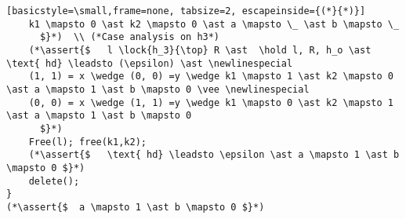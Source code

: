 \documentclass[8pt]{article}
\newcommand{\lock}[2]{ \square \hspace{-1ex} \xrightarrow[#1]{#2}}
\newcommand{\hold}{\text{Hold }}
\newcommand{\assert}[1]{\textcolor{blue}{ \{ #1 \}  } }
\newcommand{\newlinespecial}{\newline \hphantom{100pt}}
\begin{document}
\begin{lstlisting}[basicstyle=\small,frame=none, tabsize=2, escapeinside={(*}{*)}]
	k1 \mapsto 0 \ast k2 \mapsto 0 \ast a \mapsto \_ \ast b \mapsto \_
	  $}*)  \\ (*Case analysis on h3*)
	(*\assert{$   l \lock{h_3}{\top} R \ast  \hold l, R, h_o \ast  \text{ hd} \leadsto (\epsilon) \ast \newlinespecial
	(1, 1) = x \wedge (0, 0) =y \wedge k1 \mapsto 1 \ast k2 \mapsto 0 \ast a \mapsto 1 \ast b \mapsto 0 \vee \newlinespecial
	(0, 0) = x \wedge (1, 1) =y \wedge k1 \mapsto 0 \ast k2 \mapsto 1 \ast a \mapsto 1 \ast b \mapsto 0
	  $}*) 
	Free(l); free(k1,k2);
	(*\assert{$   \text{ hd} \leadsto \epsilon \ast a \mapsto 1 \ast b \mapsto 0 $}*)
	delete();
}
(*\assert{$  a \mapsto 1 \ast b \mapsto 0 $}*)
	 
\end{lstlisting}







\newpage
\end{document}
